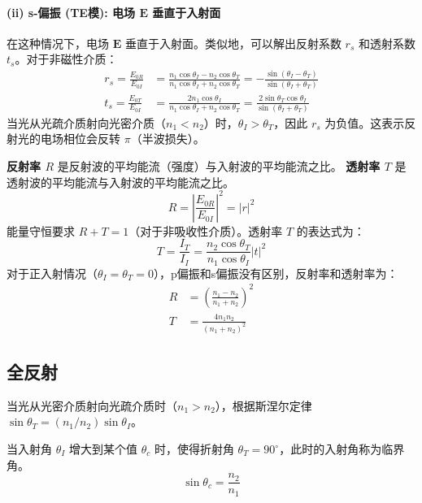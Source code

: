 \documentclass[fontset=none]{ctexart}
\begin{document}
\paragraph{(ii) s-偏振 (TE模): 电场 $\bm{E}$ 垂直于入射面}
在这种情况下，电场 $\bm{E}$ 垂直于入射面。类似地，可以解出反射系数 $r_s$ 和透射系数 $t_s$。对于非磁性介质：
\begin{align}
r_s = \frac{E_{0R}}{E_{0I}} &= \frac{n_1 \cos\theta_I - n_2 \cos\theta_T}{n_1 \cos\theta_I + n_2 \cos\theta_T} = -\frac{\sin(\theta_I - \theta_T)}{\sin(\theta_I + \theta_T)} \\
t_s = \frac{E_{0T}}{E_{0I}} &= \frac{2 n_1 \cos\theta_I}{n_1 \cos\theta_I + n_2 \cos\theta_T} = \frac{2 \sin\theta_T \cos\theta_I}{\sin(\theta_I + \theta_T)}
\end{align}
当光从光疏介质射向光密介质（$n_1 < n_2$）时，$\theta_I > \theta_T$，因此 $r_s$ 为负值。这表示反射光的电场相位会反转 $\pi$（半波损失）。

\begin{definition}[反射率和透射率]
\textbf{反射率 $R$} 是反射波的平均能流（强度）与入射波的平均能流之比。
\textbf{透射率 $T$} 是透射波的平均能流与入射波的平均能流之比。
\begin{equation}
R = \left| \frac{E_{0R}}{E_{0I}} \right|^2 = |r|^2
\end{equation}
能量守恒要求 $R+T=1$（对于非吸收性介质）。透射率 $T$ 的表达式为：
\begin{equation}
T = \frac{I_T}{I_I} = \frac{n_2 \cos\theta_T}{n_1 \cos\theta_I} |t|^2
\end{equation}
对于正入射情况（$\theta_I = \theta_T = 0$），p偏振和s偏振没有区别，反射率和透射率为：
\begin{align}
R &= \left( \frac{n_1 - n_2}{n_1 + n_2} \right)^2 \\
T &= \frac{4 n_1 n_2}{(n_1 + n_2)^2}
\end{align}
\end{definition}


\subsection{全反射}
当光从光密介质射向光疏介质时（$n_1 > n_2$），根据斯涅尔定律 $\sin\theta_T = (n_1/n_2)\sin\theta_I$。
\begin{definition}[临界角]
当入射角 $\theta_I$ 增大到某个值 $\theta_c$ 时，使得折射角 $\theta_T = 90^\circ$，此时的入射角称为临界角。
\begin{equation}
\sin\theta_c = \frac{n_2}{n_1}
\end{equation}
\end{definition}
\end{document}
